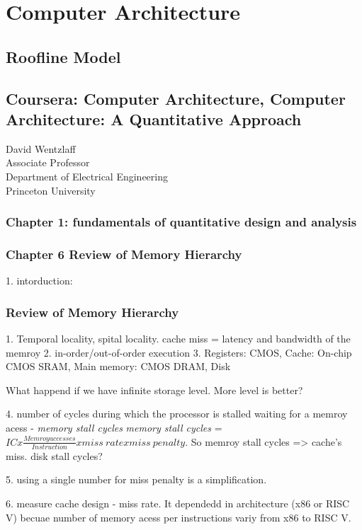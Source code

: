 \documentclass[UTF8]{article}
\begin{document}
\section{Computer Architecture}
\subsection{Roofline Model}

\subsection{Coursera: Computer Architecture, Computer Architecture: A Quantitative Approach}
David Wentzlaff\\
Associate Professor\\
Department of Electrical Engineering\\
Princeton University\\

\subsubsection{Chapter 1: fundamentals of quantitative design and analysis}

\subsubsection{Chapter 6 Review of Memory Hierarchy}
1. intorduction: 

\subsubsection{Review of Memory Hierarchy}

1. Temporal locality, spital locality. cache miss = latency and bandwidth of the memroy
2. in-order/out-of-order execution
3. Registers: CMOS, Cache: On-chip CMOS SRAM, Main memory: CMOS DRAM, Disk

What happend if we have infinite storage level. More level is better?

4. number of cycles during which the processor is stalled waiting for a memroy acess - \emph{memory stall cycles} \emph{memory stall cycles} = $ICx\frac{Memroy accesses}{Instruction}xmiss\ rate x miss\ penalty$. So memroy stall cycles => cache's miss. disk stall cycles?

5. using a single number for miss penalty is a simplification.

6. measure cache design - miss rate. It dependedd in architecture (x86 or RISC V) becuae number of memory acess per instructions variy from x86 to RISC V.
\end{document}

